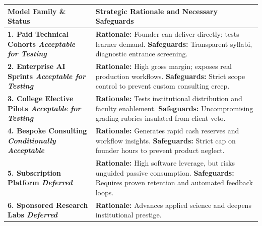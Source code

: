 \begin{table}[htbp]
\centering
\begin{tcolorbox}[
  enhanced,
  colback=white,
  colframe=BayesBorder!80!white,
  boxrule=0.4pt,
  arc=2pt,
  left=3pt,right=3pt,top=3pt,bottom=3pt,
  before skip=3pt,after skip=4pt
]
\scriptsize
\setlength{\tabcolsep}{3pt}
\renewcommand{\arraystretch}{1.18}
\begin{tabularx}{\linewidth}{@{} >{\bfseries\color{BayesInk}}p{2.3cm} >{\color{BayesInk}}X @{}}
\toprule
\textbf{Model Family \& Status} & \textbf{Strategic Rationale and Necessary Safeguards} \\
\midrule
1. Paid Technical Cohorts\newline
\textit{Acceptable for Testing} & 
\textbf{Rationale:} Founder can deliver directly; tests learner demand.\newline
\textbf{Safeguards:} Transparent syllabi, diagnostic entrance screening. \\
\midrule
2. Enterprise AI Sprints\newline
\textit{Acceptable for Testing} & 
\textbf{Rationale:} High gross margin; exposes real production workflows.\newline
\textbf{Safeguards:} Strict scope control to prevent custom consulting creep. \\
\midrule
3. College Elective Pilots\newline
\textit{Acceptable for Testing} & 
\textbf{Rationale:} Tests institutional distribution and faculty enablement.\newline
\textbf{Safeguards:} Uncompromising grading rubrics insulated from client veto. \\
\midrule
4. Bespoke Consulting\newline
\textit{Conditionally Acceptable} & 
\textbf{Rationale:} Generates rapid cash reserves and workflow insights.\newline
\textbf{Safeguards:} Strict cap on founder hours to prevent product neglect. \\
\midrule
5. Subscription Platform\newline
\textit{Deferred} & 
\textbf{Rationale:} High software leverage, but risks unguided passive consumption.\newline
\textbf{Safeguards:} Requires proven retention and automated feedback loops. \\
\midrule
6. Sponsored Research Labs\newline
\textit{Deferred} & 
\textbf{Rationale:} Advances applied science and deepens institutional prestige.\newline

\end{tabularx}
\end{tcolorbox}
\end{table}
